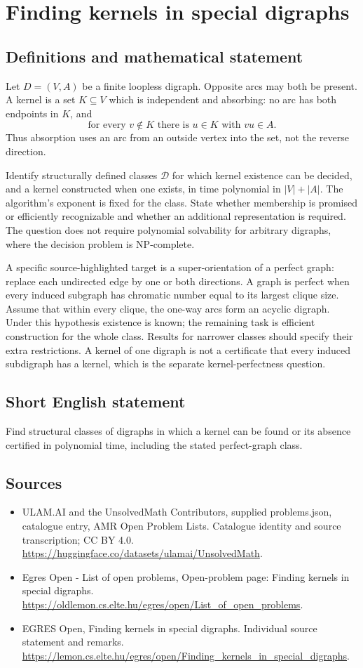 \documentclass[11pt,a4paper]{article}
\begin{document}
\section*{Finding kernels in special digraphs}\label{statement}

\subsection{Definitions and mathematical statement}
Let $D=(V,A)$ be a finite loopless digraph. Opposite arcs may both be
present. A kernel is a set $K\subseteq V$ which is independent and
absorbing: no arc has both endpoints in $K$, and
\[
             \text{for every }v\notin K\text{ there is }u\in K
                         \text{ with }vu\in A.
\]
Thus absorption uses an arc from an outside vertex into the set, not
the reverse direction.

Identify structurally defined classes $\mathcal D$ for which kernel
existence can be decided, and a kernel constructed when one exists,
in time polynomial in $|V|+|A|$. The algorithm's exponent is fixed
for the class. State whether membership is promised or efficiently
recognizable and whether an additional representation is required.
The question does not require polynomial solvability for arbitrary
digraphs, where the decision problem is NP-complete.

A specific source-highlighted target is a super-orientation of a perfect
graph: replace each undirected edge by one or both directions. A graph
is perfect when every induced subgraph has chromatic number equal to
its largest clique size. Assume that within every clique, the one-way
arcs form an acyclic digraph. Under this hypothesis existence is known;
the remaining task is efficient construction for the whole class.
Results for narrower classes should specify their extra restrictions.
A kernel of one digraph is not a certificate that every induced
subdigraph has a kernel, which is the separate kernel-perfectness question.
\subsection{Short English statement}
Find structural classes of digraphs in which a kernel can be found or its absence certified in polynomial time, including the stated perfect-graph class.
\subsection{Sources}
\begin{itemize}
\item[S1] ULAM.AI and the UnsolvedMath Contributors, supplied problems.json, catalogue entry, AMR Open Problem Lists. Catalogue identity and source transcription; CC BY 4.0.
\url{https://huggingface.co/datasets/ulamai/UnsolvedMath}.
\item[S2] Egres Open - List of open problems, Open-problem page: Finding kernels in special digraphs. 
\url{https://oldlemon.cs.elte.hu/egres/open/List_of_open_problems}.
\item[S3] EGRES Open, Finding kernels in special digraphs. Individual source statement and remarks.
\url{https://lemon.cs.elte.hu/egres/open/Finding_kernels_in_special_digraphs}.
\end{itemize}
\end{document}
